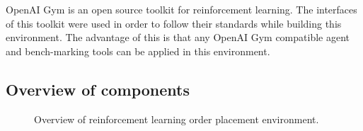OpenAI Gym \cite{brockman2016openai} is an open source toolkit for reinforcement learning.
The interfaces of this toolkit were used in order to follow their standards while building this environment.
The advantage of this is that any OpenAI Gym compatible agent and bench-marking tools can be applied in this environment.

\subsection{Overview of components}

\begin{figure}[H]
    \centering
    \caption{Overview of reinforcement learning order placement environment.}
    \label{fig:rl-env-overview}
\end{figure}


